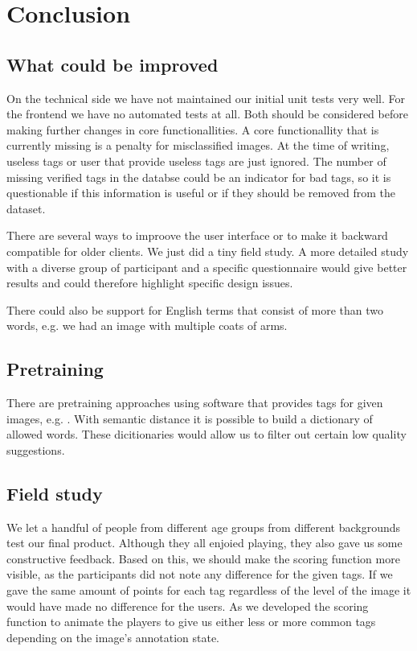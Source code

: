 \section{Conclusion}
\label{g1:sec:conclusion}

\subsection{What could be improved}
\label{g14:sec:conclusion:improved}
On the technical side we have not maintained our initial unit tests very well. For the frontend we have no automated tests at all. Both should be considered before making further changes in core functionallities.
A core functionallity that is currently missing is a penalty for misclassified images. At the time of writing, useless tags or user that provide useless tags are just ignored. The number of missing verified tags in the databse could be an indicator for bad tags, so it is questionable if this information is useful or if they should be removed from the dataset.

There are several ways to improove the user interface or to make it backward compatible for older clients. We just did a tiny field study. A more detailed study with a diverse group of participant and a specific questionnaire would give better results and could therefore highlight specific design issues.

There could also be support for English terms that consist of more than two words, e.g. we had an image with multiple coats of arms.

\subsection{Pretraining}
\label{g14:sec:conclusion:pretraining}
There are pretraining approaches using software that provides tags for given images, e.g. \cite{simonyan2014very}. With semantic distance it is possible to build a dictionary of allowed words. These dicitionaries would allow us to filter out certain low quality suggestions.

\subsection{Field study}
\label{g14:sec:conclusion:fieldstudy}
We let a handful of people from different age  groups from different backgrounds test our final product.
Although they all enjoied playing, they also gave us some constructive feedback.
Based on this, we should make the scoring function more visible, as the participants did not note any difference for the given tags.
If we gave the same amount of points for each tag regardless of the level of the image it would have made no difference for the users.
As we developed the scoring function to animate the players to give us either less or more common tags depending on the image's annotation state.

